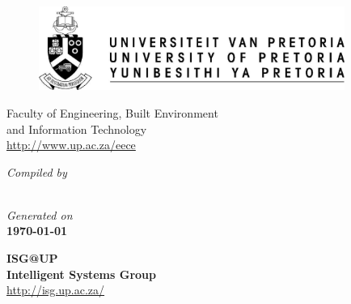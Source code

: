 
\thispagestyle{empty}
{
  \renewcommand{\baselinestretch}{1.2}
  \newcommand{\HRule}{\rule{\linewidth}{0.4mm}}
  \setlength{\parindent}{0mm}
  \setlength{\parskip}{0mm}
  \pagfamily{}
  \centering

  \begin{figure}[!ht]
    \centering\includegraphics[width=10cm]{up-logo.eps}
  \end{figure}

  \medskip
  {\sc\Large\bchfamily Faculty of Engineering, Built Environment \\
    and Information Technology} \\
  \medskip
  \medskip
  {\sc\large\sffamily \eece}
  \url{http://www.up.ac.za/eece}


  {\Large\bfseries\MakeUppercase{\doctype}}


  {\slshape Compiled by} \\
  \medskip
  \medskip
  {\large\bfseries\docauthor} \\
  {\large\docstudentnumber}

  {\slshape Generated on}\\
  \medskip
  \medskip
  {\bfseries \today}


  {\Huge\lmssfamily\bfseries ISG@UP} \\
  {\bfseries \sc \Large Intelligent Systems Group} \\
  \url{http://isg.up.ac.za/} \\
}

